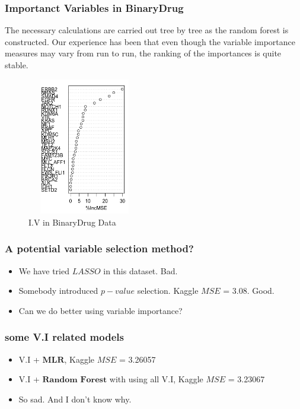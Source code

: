 \documentclass{beamer}
\begin{document}
\begin{frame}
\frametitle{Importanct Variables in BinaryDrug}
The necessary calculations are carried out tree by tree as the random forest is constructed. Our experience has been that even though the variable importance measures may vary from run to run, the ranking of the importances is quite stable.
\begin{figure}[h]
	\includegraphics[width=5cm, height=6cm]{bagging_vi}
	\caption{I.V in BinaryDrug Data}
\end{figure}
\end{frame}



\begin{frame}
\frametitle{A potential variable selection method?}
\begin{itemize}
	\item We have tried $LASSO$ in this dataset. Bad.
	
	\item Somebody introduced $p-value$ selection. Kaggle $MSE$ = 3.08. Good.
	
	\item Can we do better using variable importance?
\end{itemize}
\end{frame}

\begin{frame}
\frametitle{some V.I related models}
\begin{itemize}
	\item V.I + $\textbf{MLR}$, Kaggle $MSE$ = 3.26057
	\pause
	\item V.I + $\textbf{Random Forest}$ with using all V.I, Kaggle $MSE$ = 3.23067\\
	\pause
	\item So sad. And I don't know why.
\end{itemize}
\end{frame}
\end{document}
